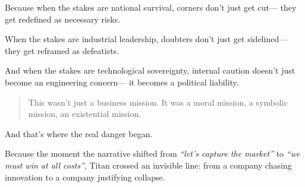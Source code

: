 Because when the stakes are national survival,
corners don’t just get cut—
they get redefined as necessary risks.

When the stakes are industrial leadership,
doubters don’t just get sidelined—
they get reframed as defeatists.

And when the stakes are technological sovereignty,
internal caution doesn’t just become an engineering concern—
it becomes a political liability.

\begin{quote}
    This wasn’t just a business mission.
    It was a moral mission,
    a symbolic mission,
    an existential mission.
\end{quote}
    
And that’s where the real danger began.

Because the moment the narrative shifted from
\textit{“let’s capture the market”}
to
\textit{“we must win at all costs”},
Titan crossed an invisible line:
from a company chasing innovation
to a company justifying collapse.

\medskip

